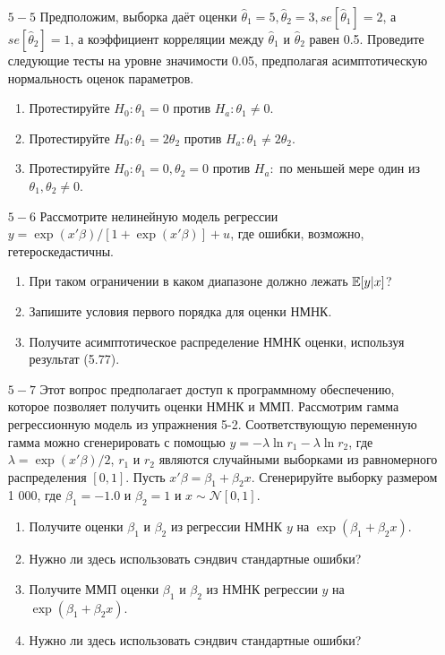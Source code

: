 \begin{enumerate}
\item [$5-5$] Предположим, выборка даёт оценки $\hat{\theta}_1=5,\hat{\theta}_2=3,se[\hat{\theta}_1]=2$, а $se[\hat{\theta}_2]=1$, а коэффициент корреляции между $\hat{\theta}_1$ и $\hat{\theta}_2$ равен 0.5. Проведите следующие тесты на уровне значимости 0.05, предполагая асимптотическую нормальность оценок параметров. 
\begin{enumerate}
\item Протестируйте $H_0: \theta_1=0$ против $H_a: \theta_1 \not= 0$.
\item Протестируйте $H_0: \theta_1=2\theta_2$ против $H_a: \theta_1 \not =2\theta_2$.
\item Протестируйте $H_0: \theta_1=0, \theta_2=0$ против $H_a:$ по меньшей мере один из $\theta_1,\theta_2 \not= 0$.
\end{enumerate}

\item [$5-6$] Рассмотрите нелинейную модель регрессии $y=\exp(x'\beta)/[1+\exp(x'\beta)]+u$, где ошибки, возможно, гетероскедастичны.
\begin{enumerate}
\item При таком ограничении в каком диапазоне должно лежать $\mathbb{E}[y|x]$?
\item Запишите условия первого порядка для оценки НМНК.
\item Получите асимптотическое распределение НМНК оценки, используя результат (5.77).
\end{enumerate}

\item [$5-7$] Этот вопрос предполагает доступ к программному обеспечению, которое позволяет получить оценки НМНК и ММП. Рассмотрим гамма регрессионную модель из упражнения 5-2. Соответствующую переменную гамма можно сгенерировать с помощью $y=-\lambda \ln r_1 - \lambda \ln r_2$, где $\lambda=\exp(x'\beta)/2$, $r_1$ и $r_2$ являются случайными выборками из равномерного распределения $[0,1]$. Пусть $x'\beta=\beta_1+\beta_2 x$. Сгенерируйте выборку размером 1 000, где $\beta_1=-1.0$ и $\beta_2=1$ и $x \sim \mathcal{N}[0,1]$.
\begin{enumerate}
\item  Получите оценки $\beta_1$ и $\beta_2$ из регрессии НМНК $y$ на $\exp(\beta_1+\beta_2 x)$. 
\item Нужно ли здесь использовать сэндвич стандартные ошибки?
\item Получите ММП оценки $\beta_1$ и $\beta_2$ из  НМНК регрессии $y$ на $\exp(\beta_1+\beta_2 x)$. 
\item Нужно ли здесь использовать сэндвич стандартные ошибки?
\end{enumerate}
\end{enumerate}

